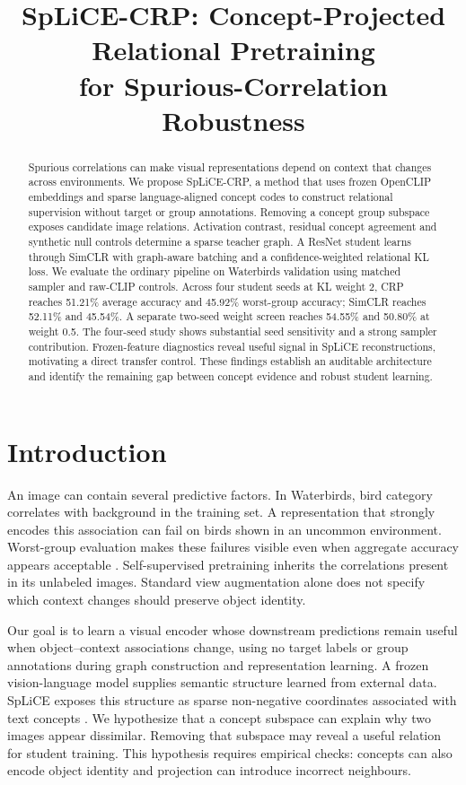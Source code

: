 \documentclass[11pt,a4paper]{article}
\title{SpLiCE-CRP: Concept-Projected Relational Pretraining\\for Spurious-Correlation Robustness}
\author{}
\date{}
\begin{document}
\maketitle
\vspace{-2em}
\begin{abstract}
Spurious correlations can make visual representations depend on context that
changes across environments. We propose SpLiCE-CRP, a method that uses frozen
OpenCLIP embeddings and sparse language-aligned concept codes to construct
relational supervision without target or group annotations. Removing a concept
group subspace exposes candidate image relations. Activation contrast, residual
concept agreement and synthetic null controls determine a sparse teacher graph.
A ResNet student learns through SimCLR with graph-aware batching and a
confidence-weighted relational KL loss. We evaluate the ordinary pipeline on
Waterbirds validation using matched sampler and raw-CLIP controls. Across four
student seeds at KL weight 2, CRP reaches 51.21\% average accuracy and 45.92\%
worst-group accuracy; SimCLR reaches 52.11\% and 45.54\%. A separate two-seed
weight screen reaches 54.55\% and 50.80\% at weight 0.5. The four-seed study shows
substantial seed sensitivity and a strong sampler contribution. Frozen-feature
diagnostics reveal useful signal in SpLiCE reconstructions, motivating a direct
transfer control. These findings establish an auditable architecture and identify
the remaining gap between concept evidence and robust student learning.
\end{abstract}

\section{Introduction}
An image can contain several predictive factors. In Waterbirds, bird category
correlates with background in the training set. A representation that strongly
encodes this association can fail on birds shown in an uncommon environment.
Worst-group evaluation makes these failures visible even when aggregate accuracy
appears acceptable \citep{sagawa2020groupdro}. Self-supervised pretraining inherits
the correlations present in its unlabeled images. Standard view augmentation
alone does not specify which context changes should preserve object identity.

Our goal is to learn a visual encoder whose downstream predictions remain useful
when object--context associations change, using no target labels or group
annotations during graph construction and representation learning. A frozen
vision-language model supplies semantic structure learned from external data.
SpLiCE exposes this structure as sparse non-negative coordinates associated with
text concepts \citep{bhalla2024splice}. We hypothesize that a concept subspace can
explain why two images appear dissimilar. Removing that subspace may reveal a
useful relation for student training. This hypothesis requires empirical checks:
concepts can also encode object identity and projection can introduce incorrect
neighbours.
\end{document}
